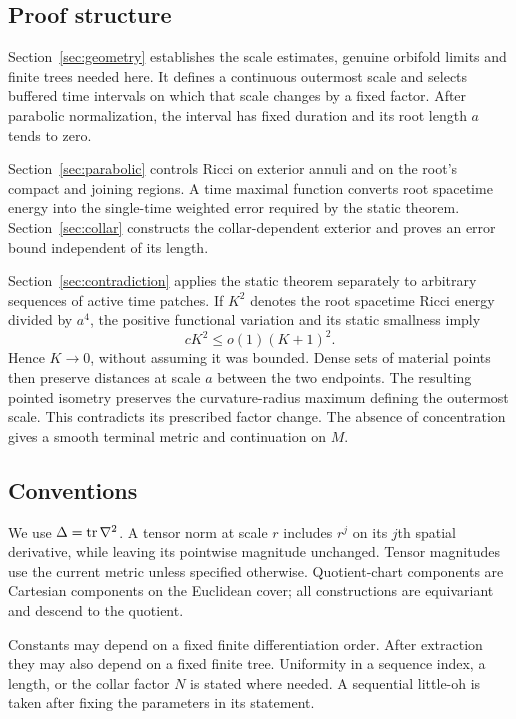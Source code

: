 \subsection{Proof structure}

Section~\ref{sec:geometry} establishes the scale estimates, genuine
orbifold limits and finite trees needed here. It defines a continuous
outermost scale and selects buffered time intervals on which that
scale changes by a fixed factor. After parabolic normalization, the
interval has fixed duration and its root length \(a\) tends to zero.

Section~\ref{sec:parabolic} controls Ricci on exterior annuli and on
the root's compact and joining regions. A time maximal function
converts root spacetime energy into the single-time weighted error
required by the static theorem. Section~\ref{sec:collar} constructs
the collar-dependent exterior and proves an error bound independent
of its length.

Section~\ref{sec:contradiction} applies the static theorem separately
to arbitrary sequences of active time patches. If \(K^2\) denotes
the root spacetime Ricci energy divided by \(a^4\), the positive
functional variation and its static smallness imply
\[
 cK^2\le o(1)(K+1)^2.
\]
Hence \(K\to0\), without assuming it was bounded. Dense sets of
material points then preserve distances at scale \(a\) between the
two endpoints. The resulting pointed isometry preserves the
curvature-radius maximum defining the outermost scale. This contradicts
its prescribed factor change. The absence of concentration gives a
smooth terminal metric and continuation on \(M\).

\subsection{Conventions}

We use \(\Delta=\operatorname{tr}\nabla^2\). A tensor norm at scale \(r\)
includes \(r^j\) on its \(j\)th spatial derivative, while leaving
its pointwise magnitude unchanged. Tensor magnitudes use the current
metric unless specified otherwise. Quotient-chart components are
Cartesian components on the Euclidean cover; all constructions are
equivariant and descend to the quotient.

Constants may depend on a fixed finite differentiation order. After
extraction they may also depend on a fixed finite tree. Uniformity
in a sequence index, a length, or the collar factor \(N\) is stated
where needed. A sequential little-oh is taken after fixing the
parameters in its statement.
